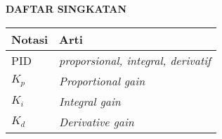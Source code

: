 \clearpage
{}
{}

\begin{center}
    \large \textbf{DAFTAR SINGKATAN}
\end{center}
\vspace{3em}

\begin{center}
    \begin{tabularx}{0.8\textwidth} {
            >{\raggedright\arraybackslash}X
            >{\raggedright\arraybackslash}X}
        \hline
        \textbf{Notasi} & \textbf{Arti}                    \\
        \hline
        PID     & \textit{\textit{proporsional, integral, derivatif}}\\
        $K_{p}$ & \textit{Proportional gain}\\
        $K_{i}$ & \textit{Integral gain}\\
        $K_{d}$ & \textit{Derivative gain}\\
        \hline
    \end{tabularx}
\end{center}